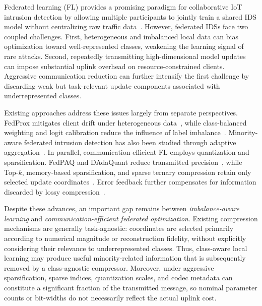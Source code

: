 \documentclass[conference,a4paper]{IEEEtran}
\begin{document}
Federated learning (FL) provides a promising paradigm for collaborative IoT
intrusion detection by allowing multiple participants to jointly train a shared
IDS model without centralizing raw traffic data~\cite{mcmahan2017fedavg}.
However, federated IDSs face two coupled challenges. First, heterogeneous and
imbalanced local data can bias optimization toward well-represented classes,
weakening the learning signal of rare attacks. Second, repeatedly transmitting
high-dimensional model updates can impose substantial uplink overhead on
resource-constrained clients. Aggressive communication reduction can further
intensify the first challenge by discarding weak but task-relevant update
components associated with underrepresented classes.


Existing approaches address these issues largely from separate perspectives.
FedProx mitigates client drift under heterogeneous
data~\cite{li2020fedprox}, while class-balanced weighting and logit calibration
reduce the influence of label imbalance~\cite{cui2019classbalanced,
zhang2022fedlc}. Minority-aware federated intrusion detection has also been
studied through adaptive aggregation~\cite{sun2025fedmade}. In parallel,
communication-efficient FL employs quantization and sparsification. FedPAQ and
DAdaQuant reduce transmitted precision~\cite{reisizadeh2020fedpaq,
honig2022dadaquant}, while Top-$k$, memory-based sparsification, and sparse
ternary compression retain only selected update
coordinates~\cite{stich2018sparsified,lin2018dgc,sattler2020stc}. Error
feedback further compensates for information discarded by lossy
compression~\cite{karimireddy2019errorfeedback}.

Despite these advances, an important gap remains between
\emph{imbalance-aware learning} and \emph{communication-efficient federated
optimization}. Existing compression mechanisms are generally task-agnostic:
coordinates are selected primarily according to numerical magnitude or
reconstruction fidelity, without explicitly considering their relevance to
underrepresented classes. Thus, class-aware local learning may produce useful
minority-related information that is subsequently removed by a
class-agnostic compressor. Moreover, under aggressive sparsification, sparse
indices, quantization scales, and codec metadata can constitute a significant
fraction of the transmitted message, so nominal parameter counts or bit-widths
do not necessarily reflect the actual uplink cost.
\end{document}
